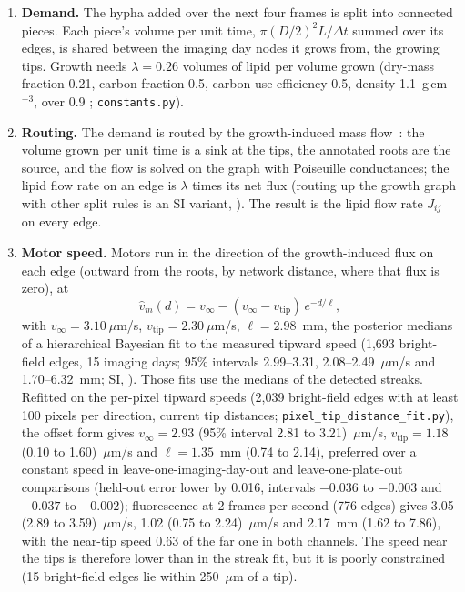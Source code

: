 \begin{enumerate}
  \item \textbf{Demand.}
The hypha added over the next four frames is split into connected pieces.
Each piece's volume per unit time, $\pi (D/2)^2 L / \Delta t$ summed over its edges, is shared between the imaging day nodes it grows from, the growing tips.
Growth needs $\lambda = 0.26$ volumes of lipid per volume grown (dry-mass fraction 0.21, carbon fraction 0.5, carbon-use efficiency 0.5, density 1.1~g\,cm$^{-3}$, over 0.9 ; \texttt{constants.py}).
  \item \textbf{Routing.}
The demand is routed by the growth-induced mass flow~\cite{heaton_growth-induced_2010}: the volume grown per unit time is a sink at the tips, the annotated roots are the source, and the flow is solved on the graph with Poiseuille conductances; the lipid flow rate on an edge is $\lambda$ times its net flux (routing up the growth graph with other split rules is an SI variant, ).
The result is the lipid flow rate $J_{ij}$ on every edge.
  \item \textbf{Motor speed.}
Motors run in the direction of the growth-induced flux on each edge (outward from the roots, by network distance, where that flux is zero), at
  \[
    \hat{v}_m(d) = v_\infty - (v_\infty - v_{\mathrm{tip}})\, e^{-d/\ell},
  \]
  with $v_\infty = 3.10~\mu$m/s, $v_{\mathrm{tip}} = 2.30~\mu$m/s, $\ell = 2.98$~mm, the posterior medians of a hierarchical Bayesian fit to the measured tipward speed (1,693 bright-field edges, 15 imaging days; 95\% intervals 2.99--3.31, 2.08--2.49~$\mu$m/s and 1.70--6.32~mm; SI, ).
Those fits use the medians of the detected streaks.
Refitted on the per-pixel tipward speeds (2,039 bright-field edges with at least 100 pixels per direction, current tip distances; \texttt{pixel\_tip\_distance\_fit.py}), the offset form gives $v_\infty = 2.93$ (95\% interval 2.81 to 3.21)~$\mu$m/s, $v_{\mathrm{tip}} = 1.18$ (0.10 to 1.60)~$\mu$m/s and $\ell = 1.35$~mm (0.74 to 2.14), preferred over a constant speed in leave-one-imaging-day-out and leave-one-plate-out comparisons (held-out error lower by 0.016, intervals $-0.036$ to $-0.003$ and $-0.037$ to $-0.002$); fluorescence at 2 frames per second (776 edges) gives 3.05 (2.89 to 3.59)~$\mu$m/s, 1.02 (0.75 to 2.24)~$\mu$m/s and 2.17~mm (1.62 to 7.86), with the near-tip speed 0.63 of the far one in both channels.
The speed near the tips is therefore lower than in the streak fit, but it is poorly constrained (15 bright-field edges lie within 250~$\mu$m of a tip).

\end{enumerate}
